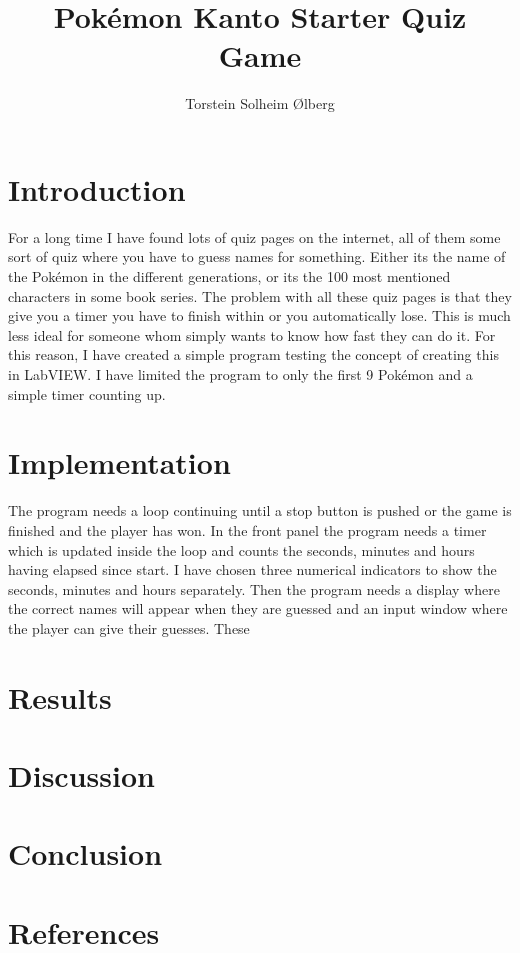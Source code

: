 \documentclass[11pt, A4paper, english]{article}
\author{Torstein Solheim Ølberg}
\title{Pokémon Kanto Starter Quiz Game}
\begin{document}
	\maketitle
	\clearpage

	\section{Introduction}
For a long time I have found lots of quiz pages on the internet, all of them some sort of quiz where you have to guess names for something. Either its the name of the Pokémon in the different generations, or its the 100 most mentioned characters in some book series. The problem with all these quiz pages is that they give you a timer you have to finish within or you automatically lose. This is much less ideal for someone whom simply wants to know how fast they can do it. For this reason, I have created a simple program testing the concept of creating this in LabVIEW. I have limited the program to only the first 9 Pokémon and a simple timer counting up.

	\section{Implementation}
The program needs a loop continuing until a stop button is pushed or the game is finished and the player has won. In the front panel the program needs a timer which is updated inside the loop and counts the seconds, minutes and hours having elapsed since start. I have chosen three numerical indicators to show the seconds, minutes and hours separately. Then the program needs a display where the correct names will appear when they are guessed and an input window where the player can give their guesses. These 

	\section{Results}
	
	\section{Discussion}
	
	\section{Conclusion}
	
	\section{References}
	
\end{document}
